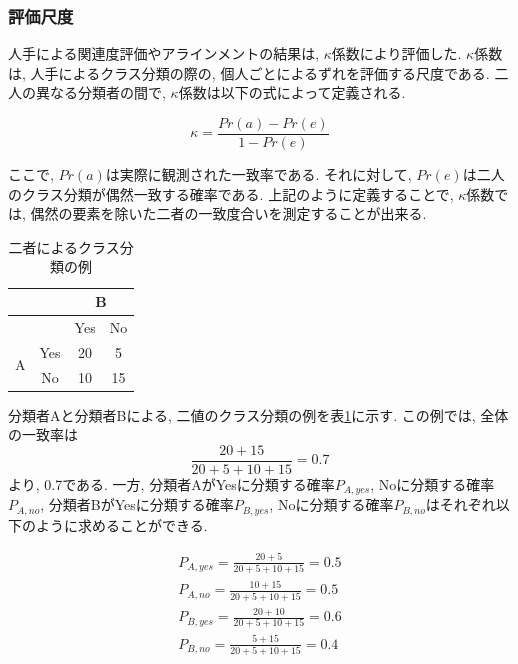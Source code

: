 \documentclass[12pt]{jarticle}
\begin{document}
\subsubsection{評価尺度}
\def\kappac{$\kappa$係数}

人手による関連度評価やアラインメントの結果は, \kappac\cite{kappa}により評価した. \kappac は, 人手によるクラス分類の際の, 個人ごとによるずれを評価する尺度である. 二人の異なる分類者の間で, \kappac は以下の式によって定義される.

\begin{equation}
\kappa = \frac{Pr(a) - Pr(e)}{1 - Pr(e)}
\end{equation}

ここで, $Pr(a)$は実際に観測された一致率である. それに対して, $Pr(e)$は二人のクラス分類が偶然一致する確率である.
上記のように定義することで, \kappac では, 偶然の要素を除いた二者の一致度合いを測定することが出来る.

\begin{table}
\begin{center}
\caption{二者によるクラス分類の例}
\label{classifi_2}
\begin{tabular}[t]{|c|c|c|c|}
  \hline
  \multirow{2}{*}{} & & \multicolumn{2}{|c|}{B} \\ \hline
                           &  & Yes & No \\ \hline
  \multirow{2}{*}{A} & Yes    & 20  &  5   \\ \cline{2-4}
                     & No     & 10  & 15  \\ \hline
\end{tabular}
\end{center}
\end{table}

分類者Aと分類者Bによる, 二値のクラス分類の例を表\ref{classifi_2}に示す.
この例では, 全体の一致率は
\begin{equation}
\frac{20 + 15}{20 + 5 + 10 + 15} = 0.7
\end{equation}
より, 0.7である.
一方, 分類者AがYesに分類する確率$P_{A,yes}$, Noに分類する確率$P_{A,no}$, 分類者BがYesに分類する確率$P_{B, yes}$, Noに分類する確率$P_{B, no}$はそれぞれ以下のように求めることができる.

\begin{eqnarray}
P_{A,yes} = \frac{20 +  5}{20 + 5 + 10 + 15} = 0.5\\
P_{A,no}  = \frac{10 + 15}{20 + 5 + 10 + 15} = 0.5\\
P_{B,yes} = \frac{20 + 10}{20 + 5 + 10 + 15} = 0.6\\
P_{B,no}  = \frac{ 5 + 15}{20 + 5 + 10 + 15} = 0.4
\end{eqnarray}
\end{document}
